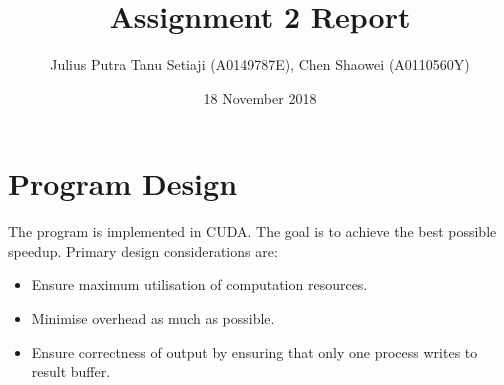 \documentclass[a4paper,12pt]{article}
\title{Assignment 2 Report}
\author{Julius Putra Tanu Setiaji (A0149787E), Chen Shaowei (A0110560Y)}
\date{18 November 2018}
\begin{document}
\maketitle

\section{Program Design}
The program is implemented in CUDA. The goal is to achieve the best possible speedup. Primary design considerations are:
\begin{itemize}
  \item Ensure maximum utilisation of computation resources.
  \item Minimise overhead as much as possible.
  \item Ensure correctness of output by ensuring that only one process writes to result buffer.
\end{itemize}
\end{document}
